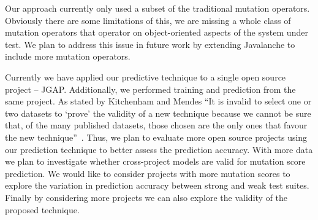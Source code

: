 \documentclass[conference]{IEEEtran}
\begin{document}
Our approach currently only used a subset of the traditional mutation operators. Obviously there are some limitations of this, we are missing a whole class of mutation operators that operator on object-oriented aspects of the system under test. We plan to address this issue in future work by extending Javalanche to include more mutation operators.

Currently we have applied our predictive technique to a single open source project -- JGAP. Additionally, we performed training and prediction from the same project. As stated by Kitchenham and Mendes ``It is invalid to select one or two datasets to `prove' the validity of a new technique because we cannot be sure that, of the many published datasets, those chosen are the only ones that favour the new technique''~\cite{KM09}. Thus, we plan to evaluate more open source projects using our prediction technique to better assess the prediction accuracy. With more data we plan to investigate whether cross-project models are valid for mutation score prediction. We would like to consider projects with more mutation scores to explore the variation in prediction accuracy between strong and weak test suites. Finally by considering more projects we can also explore the validity of the proposed technique.




\end{document}
